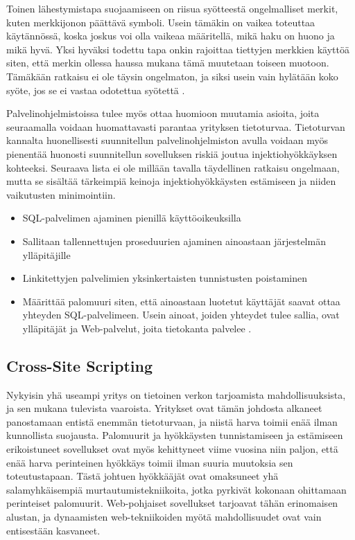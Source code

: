 Toinen lähestymistapa suojaamiseen on riisua syötteestä ongelmalliset
merkit, kuten merkkijonon päättävä symboli. Usein tämäkin on vaikea
toteuttaa käytännössä, koska joskus voi olla vaikeaa määritellä, mikä
haku on huono ja mikä hyvä. Yksi hyväksi todettu tapa onkin rajoittaa
tiettyjen merkkien käyttöä siten, että merkin ollessa haussa mukana
tämä muutetaan toiseen muotoon. Tämäkään ratkaisu ei ole täysin
ongelmaton, ja siksi usein vain hylätään koko syöte, jos se ei vastaa
odotettua syötettä \cite{SQLSS}.

Palvelinohjelmistoissa tulee myös ottaa huomioon muutamia asioita, joita seuraamalla voidaan huomattavasti parantaa yrityksen tietoturvaa.
Tietoturvan kannalta huonellisesti suunnitellun palvelinohjelmiston avulla voidaan myös pienentää huonosti suunnitellun sovelluksen riskiä joutua injektiohyökkäyksen kohteeksi. 
Seuraava lista ei ole millään tavalla täydellinen ratkaisu ongelmaan,
mutta se sisältää tärkeimpiä keinoja injektiohyökkäysten estämiseen ja
niiden vaikutusten minimointiin.

\begin{itemize}
\item SQL-palvelimen ajaminen pienillä käyttöoikeuksilla
\item Sallitaan tallennettujen proseduurien ajaminen ainoastaan järjestelmän ylläpitäjille
\item Linkitettyjen palvelimien yksinkertaisten tunnistusten poistaminen
\item Määrittää palomuuri siten, että ainoastaan luotetut käyttäjät saavat ottaa yhteyden SQL-palvelimeen. Usein ainoat, joiden yhteydet 
      tulee sallia, ovat ylläpitäjät ja Web-palvelut, joita tietokanta palvelee \cite{SQLSS}.
\end{itemize}


\subsection{Cross-Site Scripting}
Nykyisin yhä useampi yritys on tietoinen verkon tarjoamista mahdollisuuksista, ja sen mukana tulevista vaaroista. Yritykset ovat tämän johdosta
alkaneet panostamaan entistä enemmän tietoturvaan, ja niistä harva toimii enää ilman kunnollista suojausta. Palomuurit ja hyökkäysten tunnistamiseen
ja estämiseen erikoistuneet sovellukset ovat myös kehittyneet viime vuosina niin paljon, että enää harva perinteinen hyökkäys toimii ilman
suuria muutoksia sen toteutustapaan. Tästä johtuen hyökkääjät ovat omaksuneet yhä salamyhkäisempiä murtautumistekniikoita, jotka pyrkivät kokonaan
ohittamaan perinteiset palomuurit. Web-pohjaiset sovellukset tarjoavat tähän erinomaisen alustan, ja dynaamisten web-tekniikoiden myötä mahdollisuudet 
ovat vain entisestään kasvaneet.

